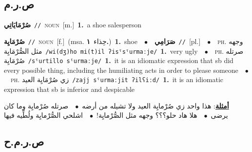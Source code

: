 \documentclass[10pt,a4paper,twoside]{article} %
\begin{document}
\begin{multicols}{2}
\vspace{-3mm}
\subsection*{\color{blue}\foreignlanguage{arabic}{ص.ر.م}\color{blue}{}} 

{\setlength\topsep{0pt}\textbf{\foreignlanguage{arabic}{صُرْمَايَاتِي}}\ {\color{gray}\texttt{//}\color{black}}\ \textsc{noun}\ [m.]\ \textbf{1.}~a shoe salesperson\ } \vspace{2mm}

{\setlength\topsep{0pt}\textbf{\foreignlanguage{arabic}{صُرْمَايِة}}\ {\color{gray}\texttt{//}\color{black}}\ \textsc{noun}\ [f.]\ \color{gray}(msa. \foreignlanguage{arabic}{حِذاء}~\foreignlanguage{arabic}{\textbf{١.}})\color{black}\ \textbf{1.}~shoe\ \ $\bullet$\ \ \setlength\topsep{0pt}\textbf{\foreignlanguage{arabic}{صَرَامِي}}\ {\color{gray}\texttt{//}\color{black}}\ [pl.]\ \ $\bullet$\ \ \textsc{ph.} \color{gray} \foreignlanguage{arabic}{وجهه مثل الصُّرْمَايِة}\color{black}\ {\color{gray}\texttt{/{\sffamily wi(dʒ)ho mi(t)il ʔisˤsˤurmaːje}/}\color{black}}\ \textbf{1.}~very ugly\ \ $\bullet$\ \ \textsc{ph.} \color{gray} \foreignlanguage{arabic}{صرتله صُرْمَايِة}\color{black}\ {\color{gray}\texttt{/{\sffamily sˤurtillo sˤurmaːje}/}\color{black}}\ \textbf{1.}~it is an idiomatic expression that sb did every possible thing, including the humiliating acts in order to please someone\ \ $\bullet$\ \ \textsc{ph.} \color{gray} \foreignlanguage{arabic}{زي صُرْمَايِة العيد}\color{black}\ {\color{gray}\texttt{/{\sffamily zajj sˤurmaːjit ʔilʕiːd}/}\color{black}}\ \textbf{1.}~it is an idiomatic expression that sb is inferior and despicable\  \begin{flushright}\color{gray}\foreignlanguage{arabic}{\textbf{\underline{\foreignlanguage{arabic}{أمثلة}}}: هذا واحد زي صُرْمايِة العيد ولا تشيله من أرضه\ $\bullet$\ \  صرتله صُرْمايِة وما كان يرضى\ $\bullet$\ \  هلا هاد حلو؟؟؟ وجهه مثل الصُّرْمايِة!\ $\bullet$\ \  اشلحي الصُّرْمايِة ولُطِّيه فيها}\end{flushright}\color{black}} \vspace{2mm}

\vspace{-3mm}
\subsection*{\color{blue}\foreignlanguage{arabic}{ص.ر.م.ح}\color{blue}{}} 


\end{multicols}
\end{document}
